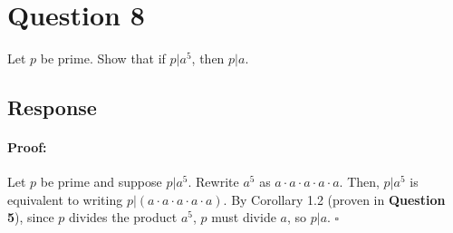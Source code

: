 \documentclass [12pt] {article}
\newenvironment{proof}{\paragraph{Proof:}}{\hfill$\square$}
\begin{document}
\newpage

\section*{Question 8}
Let $p$ be prime. Show that if $p|a^5$, then $p|a$. 

\subsection*{Response}
\begin{proof}
Let $p$ be prime and suppose $p | a^5$. Rewrite $a^5$ as $a \cdot a \cdot a \cdot a \cdot a$. Then, 
$p | a^5$ is equivalent to writing $p | (a \cdot a \cdot a \cdot a \cdot a)$. By 
Corollary 1.2 (proven in \textbf{Question 5}), since $p$ divides the product $a^5$, $p$ must divide 
$a$, so $p | a$.
\end{proof}
\newpage
\end{document}
